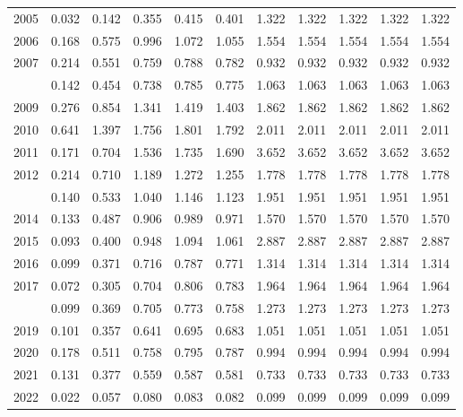 \documentclass[
]{article}
\begin{document}
\begin{longtable}[t]{lrrrrrrrrrr}
2005 & 0.032 & 0.142 & 0.355 & 0.415 & 0.401 & 1.322 & 1.322 & 1.322 & 1.322 & 1.322\\
2006 & 0.168 & 0.575 & 0.996 & 1.072 & 1.055 & 1.554 & 1.554 & 1.554 & 1.554 & 1.554\\
2007 & 0.214 & 0.551 & 0.759 & 0.788 & 0.782 & 0.932 & 0.932 & 0.932 & 0.932 & 0.932\\
\addlinespace
2008 & 0.142 & 0.454 & 0.738 & 0.785 & 0.775 & 1.063 & 1.063 & 1.063 & 1.063 & 1.063\\
2009 & 0.276 & 0.854 & 1.341 & 1.419 & 1.403 & 1.862 & 1.862 & 1.862 & 1.862 & 1.862\\
2010 & 0.641 & 1.397 & 1.756 & 1.801 & 1.792 & 2.011 & 2.011 & 2.011 & 2.011 & 2.011\\
2011 & 0.171 & 0.704 & 1.536 & 1.735 & 1.690 & 3.652 & 3.652 & 3.652 & 3.652 & 3.652\\
2012 & 0.214 & 0.710 & 1.189 & 1.272 & 1.255 & 1.778 & 1.778 & 1.778 & 1.778 & 1.778\\
\addlinespace
2013 & 0.140 & 0.533 & 1.040 & 1.146 & 1.123 & 1.951 & 1.951 & 1.951 & 1.951 & 1.951\\
2014 & 0.133 & 0.487 & 0.906 & 0.989 & 0.971 & 1.570 & 1.570 & 1.570 & 1.570 & 1.570\\
2015 & 0.093 & 0.400 & 0.948 & 1.094 & 1.061 & 2.887 & 2.887 & 2.887 & 2.887 & 2.887\\
2016 & 0.099 & 0.371 & 0.716 & 0.787 & 0.771 & 1.314 & 1.314 & 1.314 & 1.314 & 1.314\\
2017 & 0.072 & 0.305 & 0.704 & 0.806 & 0.783 & 1.964 & 1.964 & 1.964 & 1.964 & 1.964\\
\addlinespace
2018 & 0.099 & 0.369 & 0.705 & 0.773 & 0.758 & 1.273 & 1.273 & 1.273 & 1.273 & 1.273\\
2019 & 0.101 & 0.357 & 0.641 & 0.695 & 0.683 & 1.051 & 1.051 & 1.051 & 1.051 & 1.051\\
2020 & 0.178 & 0.511 & 0.758 & 0.795 & 0.787 & 0.994 & 0.994 & 0.994 & 0.994 & 0.994\\
2021 & 0.131 & 0.377 & 0.559 & 0.587 & 0.581 & 0.733 & 0.733 & 0.733 & 0.733 & 0.733\\
2022 & 0.022 & 0.057 & 0.080 & 0.083 & 0.082 & 0.099 & 0.099 & 0.099 & 0.099 & 0.099\\*
\end{longtable}
\end{document}
